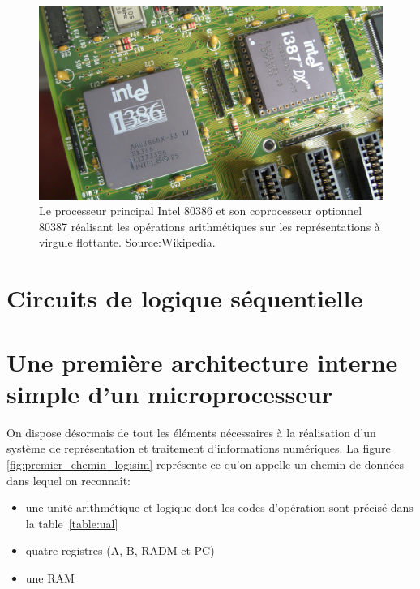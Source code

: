 \begin{figure}[htbp]
\begin{center}
\includegraphics[width=0.5\columnwidth]{Figs/80386with387.JPG}
\end{center}
\caption{Le processeur principal Intel 80386 et son coprocesseur optionnel 80387 réalisant les opérations arithmétiques sur les représentations à virgule flottante. Source:Wikipedia.}
\end{figure}


\pagebreak
\section{Circuits de logique séquentielle}




\vfill
\pagebreak


\section{Une première architecture interne simple d'un microprocesseur}

On dispose désormais de tout les éléments nécessaires à la réalisation d'un système de représentation et traitement d'informations numériques. La figure \ref{fig:premier_chemin_logisim} représente ce qu'on appelle un chemin de données dans lequel on reconnaît: 
\begin{itemize}
\item une unité arithmétique et logique dont les codes d'opération sont précisé dans la table~\ref{table:ual}
\item quatre registres (A, B, RADM et PC)
\item une RAM
\end{itemize}


